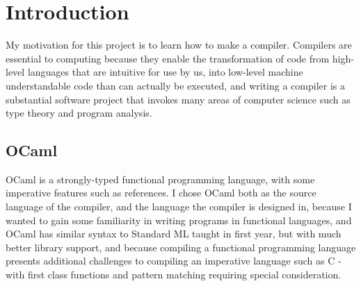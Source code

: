 \chapter{Introduction}

My motivation for this project is to learn how to make a compiler. Compilers are essential to computing because they enable the transformation of code from high-level languages that are intuitive for use by us, into low-level machine understandable code than can actually be executed, and writing a compiler is a substantial software project that invokes many areas of computer science such as type theory and program analysis.


\section{OCaml}
OCaml\cite{OCaml} is a strongly-typed functional programming language, with some imperative features such as references. I chose OCaml both as the source language of the compiler, and the language the compiler is designed in, because I wanted to gain some familiarity in writing programs in functional languages, and OCaml has similar syntax to Standard ML taught in first year, but with much better library support, and because compiling a functional programming language presents additional challenges to compiling an imperative language such as C - with first class functions and pattern matching requiring special consideration.

